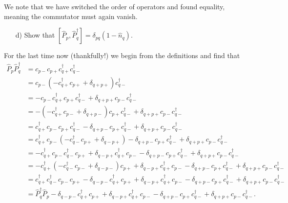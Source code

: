 \documentclass[a4paper]{article}
\newcommand{\nn}{\nonumber}
\newcommand{\cpp}{c_{p+}}
\newcommand{\cpm}{c_{p-}}
\newcommand{\cqpd}{c_{q+}^\dagger}
\newcommand{\cqmd}{c_{q-}^\dagger}
\begin{document}
We note that we have switched the order of operators and found equality, meaning the commutator must again vanish.
\begin{exframe}
\begin{itemize}
  \item[d)] Show that $[\hat P_p, \hat P_q^\dagger] = \delta_{pq}(1-\hat n_q).$
\end{itemize}
\end{exframe}
For the last time now (thankfully!) we begin from the definitions and find that
\begin{align}
\hat P_p \hat P_q^\dagger &= \cpm \cpp \cqpd \cqmd \nn\\
%
&= \cpm (-\cqpd\cpp + \delta_{q+p+}) \cqmd \nn\\
%
&= -\cpm \cqpd\cpp \cqmd + \delta_{q+p+} \cpm\cqmd \nn\\
%
&= -(- \cqpd\cpm + \delta_{q+p-})\cpp \cqmd + \delta_{q+p+} \cpm\cqmd \nn\\
%
&= \cqpd\cpm \cpp \cqmd - \delta_{q+p-}\cpp \cqmd + \delta_{q+p+} \cpm\cqmd \nn\\
%
&= \cqpd\cpm (-\cqmd\cpp + \delta_{q-p+}) - \delta_{q+p-}\cpp \cqmd + \delta_{q+p+} \cpm\cqmd \nn\\
%
&= -\cqpd\cpm \cqmd\cpp + \delta_{q-p+}\cqpd\cpm - \delta_{q+p-}\cpp \cqmd + \delta_{q+p+} \cpm\cqmd \nn\\
%
&= -\cqpd(- \cqmd\cpm + \delta_{q-p-})\cpp + \delta_{q-p+}\cqpd\cpm - \delta_{q+p-}\cpp \cqmd + \delta_{q+p+} \cpm\cqmd \nn\\
%
&= \cqpd\cqmd\cpm \cpp - \delta_{q-p-} \cqpd\cpp+ \delta_{q-p+}\cqpd\cpm - \delta_{q+p-}\cpp \cqmd + \delta_{q+p+} \cpm\cqmd \nn\\
&= \hat P_q^\dagger \hat P_p - \delta_{q-p-} \cqpd\cpp+ \delta_{q-p+}\cqpd\cpm - \delta_{q+p-}\cpp \cqmd + \delta_{q+p+} \cpm\cqmd.
\end{align}
\end{document}
